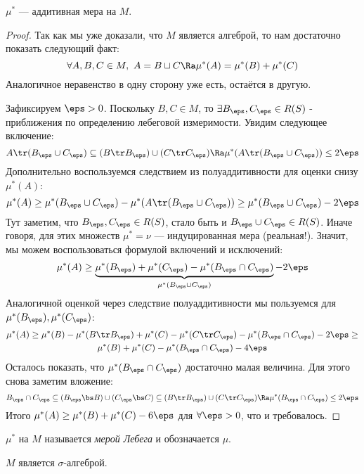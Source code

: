 \begin{theorem}
	$\mu^*$ --- аддитивная мера на $M$.
\end{theorem}

\begin{proof}
	Так как мы уже доказали, что $M$ является алгеброй, то нам достаточно показать следующий факт:
	\[
		\forall A, B, C \in M,\ A = B \sqcup C \Ra \mu^*(A) = \mu^*(B) + \mu^*(C)
	\]
	Аналогичное неравенство в одну сторону уже есть, остаётся в другую.
	
	Зафиксируем $\eps > 0$. Поскольку $B, C \in M$, то $\exists B_\eps, C_\eps \in R(S)$ - приближения по определению лебеговой измеримости. Увидим следующее включение:
	\[
		A \tr (B_\eps \cup C_\eps) \subseteq (B \tr B_\eps) \cup (C \tr C_\eps) \Ra \mu^*(A \tr (B_\eps \cup C_\eps)) \le 2\eps
	\]
	Дополнительно воспользуемся следствием из полуаддитивности для оценки снизу $\mu^*(A)$:
	\[
		\mu^*(A) \ge \mu^*(B_\eps \cup C_\eps) - \mu^*(A \tr (B_\eps \cup C_\eps)) \ge \mu^*(B_\eps \cup C_\eps) - 2\eps
	\]
	Тут заметим, что $B_\eps, C_\eps \in R(S)$, стало быть и $B_\eps \cup C_\eps \in R(S)$. Иначе говоря, для этих множеств $\mu^* = \nu$ --- индуцированная мера (реальная!). Значит, мы можем воспользоваться формулой включений и исключений:
	\[
		\mu^*(A) \ge \underbrace{\mu^*(B_\eps) + \mu^*(C_\eps) - \mu^*(B_\eps \cap C_\eps)}_{\mu^*(B_\eps \cup C_\eps)} - 2\eps
	\]
	Аналогичной оценкой через следствие полуаддитивности мы пользуемся для $\mu^*(B_\eps), \mu^*(C_\eps)$:
	\begin{multline*}
		\mu^*(A) \ge \mu^*(B) - \mu^*(B \tr B_\eps) + \mu^*(C) - \mu^*(C \tr C_\eps) - \mu^*(B_\eps \cap C_\eps) - 2\eps \ge
		\\
		\mu^*(B) + \mu^*(C) - \mu^*(B_\eps \cap C_\eps) - 4\eps
	\end{multline*}
	Осталось показать, что $\mu^*(B_\eps \cap C_\eps)$ достаточно малая величина. Для этого снова заметим вложение:
	\[
		B_\eps \cap C_\eps \subseteq (B_\eps \bs B) \cup (C_\eps \bs C) \subseteq (B \tr B_\eps) \cup (C \tr C_\eps) \Ra \mu^*(B_\eps \cap C_\eps) \le 2\eps
	\]
	Итого $\mu^*(A) \ge \mu^*(B) + \mu^*(C) - 6\eps$ для $\forall \eps > 0$, что и требовалось.
\end{proof}

\begin{definition}
	$\mu^*$ на $M$ называется \textit{мерой Лебега} и обозначается $\mu$.
\end{definition}

\begin{theorem}
	$M$ является $\sigma$-алгеброй.
\end{theorem}


